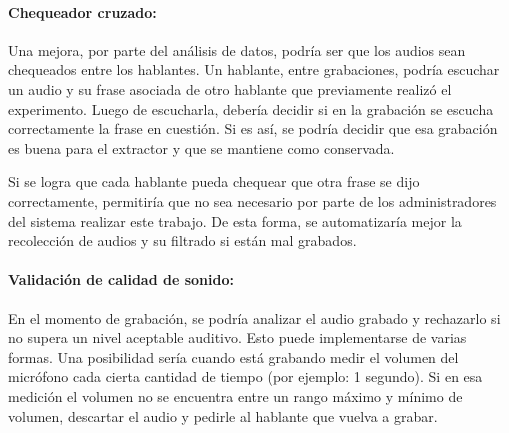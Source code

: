 

\paragraph*{Chequeador cruzado:} Una mejora, por parte del análisis de datos, podría ser que los audios sean chequeados entre los hablantes. Un hablante, entre grabaciones, podría escuchar un audio y su frase asociada de otro hablante que previamente realizó el experimento. Luego de escucharla, debería decidir si en la grabación se escucha correctamente la frase en cuestión. Si es así, se podría decidir que esa grabación es buena para el extractor y que se mantiene como conservada.

Si se logra que cada hablante pueda chequear que otra frase se dijo correctamente, permitiría que no sea necesario por parte de los administradores del sistema realizar este trabajo. De esta forma, se automatizaría mejor la recolección de audios y su filtrado si están mal grabados.

\paragraph*{Validación de calidad de sonido:} En el momento de grabación, se podría analizar el audio grabado y rechazarlo si no supera un nivel aceptable auditivo. Esto puede implementarse de varias formas. Una posibilidad sería cuando está grabando medir el volumen del micrófono cada cierta cantidad de tiempo (por ejemplo: 1 segundo). Si en esa medición el volumen no se encuentra entre un rango máximo y mínimo de volumen, descartar el audio y pedirle al hablante que vuelva a grabar.

